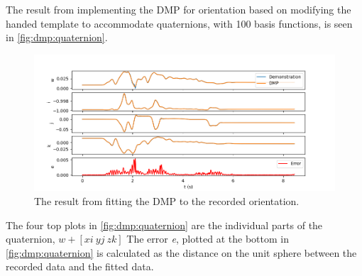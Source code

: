 \documentclass[../main.tex]{subfiles}
\begin{document}
The result from implementing the DMP for orientation based on modifying the handed template \cite{inigo} to accommodate quaternions, with 100 basis functions, is seen in \autoref{fig:dmp:quaternion}.
\begin{figure}[H]
    \centering
    \includegraphics[width=\textwidth]{figures/DMP_quat/quat_dmp.png}
    \caption{The result from fitting the DMP to the recorded orientation.}
    \label{fig:dmp:quaternion}
\end{figure}
The four top plots in \autoref{fig:dmp:quaternion} are the individual parts of the quaternion, $w + [xi\ yj\ zk]$ The error \textit{e}, plotted at the bottom in \autoref{fig:dmp:quaternion} is calculated as the distance on the unit sphere between the recorded data and the fitted data.
\end{document}
